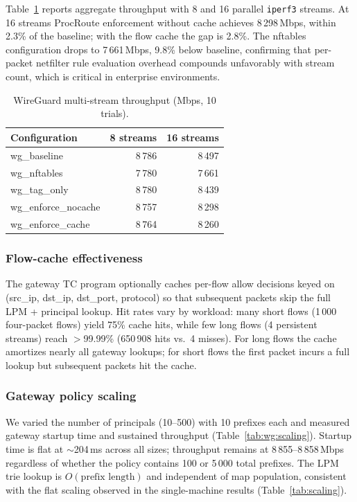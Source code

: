 \documentclass[sigconf]{acmart}
\begin{document}
Table~\ref{tab:wg:multistream} reports aggregate throughput with
8 and 16 parallel \texttt{iperf3} streams.
At 16 streams ProcRoute enforcement without cache achieves
8\,298\,Mbps, within 2.3\% of the baseline;
with the flow cache the gap is 2.8\%.
The nftables configuration drops to 7\,661\,Mbps, 9.8\% below
baseline, confirming that per-packet netfilter rule evaluation overhead compounds
unfavorably with stream count, which is critical in enterprise environments.

\begin{table}[t]
\centering
\caption{WireGuard multi-stream throughput (Mbps, 10 trials).}
\label{tab:wg:multistream}
\begin{tabular}{lrr}
\toprule
Configuration & 8 streams & 16 streams \\
\midrule
wg\_baseline          & 8\,786 & 8\,497 \\
wg\_nftables          & 7\,780 & 7\,661 \\
wg\_tag\_only         & 8\,780 & 8\,439 \\
wg\_enforce\_nocache  & 8\,757 & 8\,298 \\
wg\_enforce\_cache    & 8\,764 & 8\,260 \\
\bottomrule
\end{tabular}
\end{table}

\subsubsection{Flow-cache effectiveness}

The gateway TC program optionally caches per-flow allow
decisions keyed on (src\_ip, dst\_ip, dst\_port, protocol)
so that subsequent packets skip the full LPM + principal
lookup.
Hit rates vary by workload: many short flows (1\,000
four-packet flows) yield 75\% cache hits, while few long
flows (4 persistent streams) reach $>$99.99\% (650\,908
hits vs.\ 4 misses).
For long flows the cache amortizes nearly all gateway
lookups; for short flows the first packet incurs a full
lookup but subsequent packets hit the cache.

\subsubsection{Gateway policy scaling}

We varied the number of principals (10--500) with 10 prefixes each
and measured gateway startup time and sustained throughput
(Table~\ref{tab:wg:scaling}).
Startup time is flat at $\sim$204\,ms across all sizes; throughput
remains at 8\,855--8\,858\,Mbps regardless of whether the policy
contains 100 or 5\,000 total prefixes.
The LPM trie lookup is $O(\text{prefix length})$ and independent of
map population, consistent with the flat scaling observed in the
single-machine results (Table~\ref{tab:scaling}).
\end{document}
